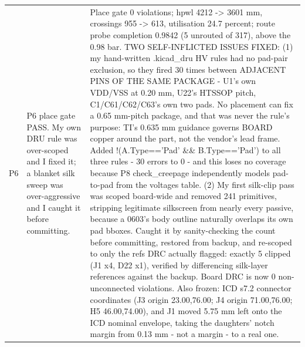 \documentclass[11pt,a4paper]{article}
\begin{document}
{\begin{longtable}{lp{5.2cm}p{7.2cm}}
P6 & P6 place gate PASS. My own DRU rule was over-scoped and I fixed it; a blanket silk sweep was over-aggressive and I caught it before committing. & Place gate 0 violations; hpwl 4212 -\textgreater{} 3601 mm, crossings 955 -\textgreater{} 613, utilisation 24.7 percent; route probe completion 0.9842 (5 unrouted of 317), above the 0.98 bar. TWO SELF-INFLICTED ISSUES FIXED: (1) my hand-written .kicad\_dru HV rules had no pad-pair exclusion, so they fired 30 times between ADJACENT PINS OF THE SAME PACKAGE - U1's own VDD/VSS at 0.20 mm, U22's HTSSOP pitch, C1/C61/C62/C63's own two pads. No placement can fix a 0.65 mm-pitch package, and that was never the rule's purpose: TI's 0.635 mm guidance governs BOARD copper around the part, not the vendor's lead frame. Added !(A.Type=='Pad' \&\& B.Type=='Pad') to all three rules - 30 errors to 0 - and this loses no coverage because P8 check\_creepage independently models pad-to-pad from the voltages table. (2) My first silk-clip pass was scoped board-wide and removed 241 primitives, stripping legitimate silkscreen from nearly every passive, because a 0603's body outline naturally overlaps its own pad bboxes. Caught it by sanity-checking the count before committing, restored from backup, and re-scoped to only the refs DRC actually flagged: exactly 5 clipped (J1 x4, D22 x1), verified by differencing silk-layer references against the backup. Board DRC is now 0 non-unconnected violations. Also frozen: ICD s7.2 connector coordinates (J3 origin 23.00,76.00; J4 origin 71.00,76.00; H5 46.00,74.00), and J1 moved 5.75 mm left onto the ICD nominal envelope, taking the daughters' notch margin from 0.13 mm - not a margin - to a real one. \\

\end{longtable}}
\end{document}
